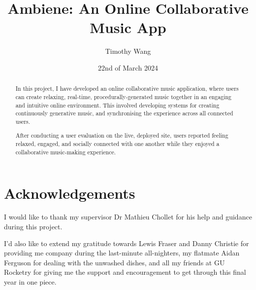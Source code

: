 \documentclass{l4proj}
\begin{document}
\title{Ambiene: An Online Collaborative Music App} %
\author{Timothy Wang}
\date{22nd of March 2024}

\maketitle

\begin{abstract}
In this project, I have developed an online collaborative music application, where users can create relaxing, real-time, procedurally-generated music together in an engaging and intuitive online environment. This involved developing systems for creating continuously generative music, and synchronising the experience across all connected users.

After conducting a user evaluation on the live, deployed site, users reported feeling relaxed, engaged, and socially connected with one another while they enjoyed a collaborative music-making experience.
\end{abstract}

\chapter*{Acknowledgements}
I would like to thank my supervisor Dr Mathieu Chollet for his help and guidance during this project.

I'd also like to extend my gratitude towards Lewis Fraser and Danny Christie for providing me company during the last-minute all-nighters, my flatmate Aidan Ferguson for dealing with the unwashed dishes, and all my friends at GU Rocketry for giving me the support and encouragement to get through this final year in one piece.


%
%
\def\consentname {Timothy Wang} %
\def\consentdate {22nd of March 2024} %
%
\educationalconsent
\end{document}
